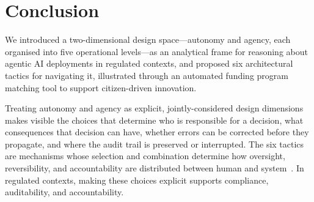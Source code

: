 \section{Conclusion}

We introduced a two-dimensional design space---autonomy and agency, each organised into five operational levels---as an analytical frame for reasoning about agentic AI deployments in regulated contexts, and proposed six architectural tactics for navigating it, illustrated through an automated funding program matching tool to support citizen-driven innovation.

Treating autonomy and agency as explicit, jointly-considered design dimensions makes visible the choices that determine who is responsible for a decision, what consequences that decision can have, whether errors can be corrected before they propagate, and where the audit trail is preserved or interrupted. The six tactics are mechanisms whose selection and combination determine how oversight, reversibility, and accountability are distributed between human and system~\cite{Lange2025}. In regulated contexts, making these choices explicit supports compliance, auditability, and accountability.
